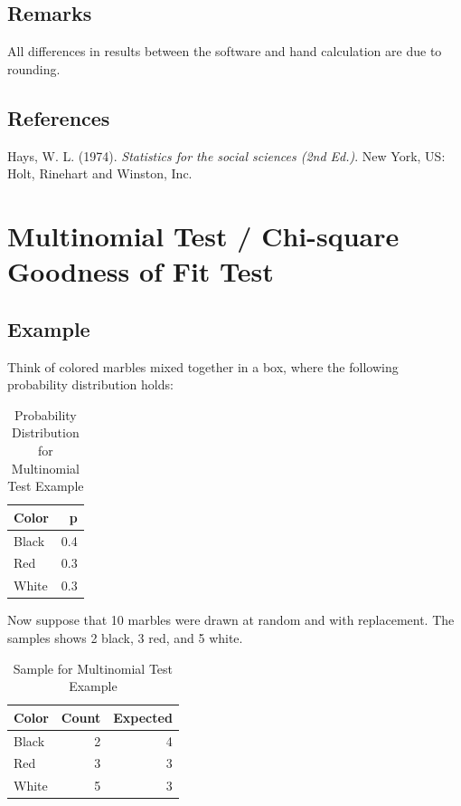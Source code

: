 \documentclass[
]{book}
\begin{document}
\hypertarget{remarks}{%
\subsection{Remarks}\label{remarks}}

All differences in results between the software and hand calculation are due to rounding.

\hypertarget{references}{%
\subsection{References}\label{references}}

Hays, W. L. (1974). \emph{Statistics for the social sciences (2nd Ed.)}. New York, US: Holt, Rinehart and Winston, Inc.

\hypertarget{multinomial-test-chi-square-goodness-of-fit-test}{%
\section{Multinomial Test / Chi-square Goodness of Fit Test}\label{multinomial-test-chi-square-goodness-of-fit-test}}

\hypertarget{example-1}{%
\subsection{Example}\label{example-1}}

Think of colored marbles mixed together in a box, where the following probability distribution holds:

\begin{table}

\caption{\label{tab:unnamed-chunk-104}Probability Distribution for Multinomial Test Example}
\centering
\begin{tabular}[t]{lr}
\toprule
Color & p\\
\midrule
Black & 0.4\\
Red & 0.3\\
White & 0.3\\
\bottomrule
\end{tabular}
\end{table}

Now suppose that 10 marbles were drawn at random and with replacement. The samples shows 2 black, 3 red, and 5 white.

\begin{table}

\caption{\label{tab:unnamed-chunk-105}Sample for Multinomial Test Example}
\centering
\begin{tabular}[t]{lrr}
\toprule
Color & Count & Expected\\
\midrule
Black & 2 & 4\\
Red & 3 & 3\\
White & 5 & 3\\
\bottomrule
\end{tabular}
\end{table}
\end{document}
